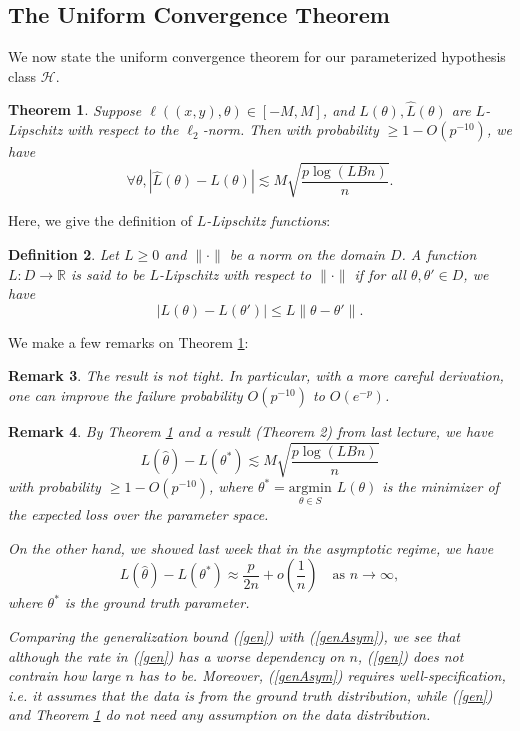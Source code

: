 \documentclass[11pt]{article}
\newtheorem{theorem}{Theorem}
\newtheorem{definition}[theorem]{Definition}
\newtheorem{remark}[theorem]{Remark}
\newcommand{\R}{\mathbb{R}}
\newcommand{\norm}[1]{\| #1 \|}
\begin{document}
\subsection{The Uniform Convergence Theorem}
We now state the uniform convergence theorem for our parameterized hypothesis class $\mathcal H$.

\begin{theorem}\label{main}
Suppose $\ell((x,y), \theta) \in [-M,M]$, and $L(\theta), \hat L(\theta)$ are $L$-Lipschitz with respect to the $\ell_2$-norm. Then with probability $\ge 1-O(p^{-10})$, we have
\begin{equation}
    \forall \theta, |\hat L(\theta)- L(\theta)| \lesssim M \sqrt{\frac{p \log(LBn)}{n}}.
\end{equation}
\end{theorem}
Here, we give the definition of \emph{$L$-Lipschitz functions}:
\begin{definition}
Let $L \ge 0$ and $\norm{\cdot}$ be a norm on the domain $D$. A function $L:D \to \R$ is said to be \emph{$L$-Lipschitz} with respect to $\norm{\cdot}$ if for all $\theta, \theta' \in D$, we have
$$
    |L(\theta)-L(\theta')| \le L \norm{\theta-\theta'}.
$$
\end{definition}

We make a few remarks on Theorem \ref{main}:
\begin{remark} \label{Tight}
    The result is not tight. In particular, with a more careful derivation, one can improve the failure probability $O(p^{-10})$ to $O(e^{-p})$.
\end{remark}   

\begin{remark}
    By Theorem \ref{main} and a result (Theorem 2) from last lecture, we have \begin{equation}\label{gen}L(\hat \theta) - L(\theta^*) \lesssim M \sqrt{\frac{p \log (LBn)}{n}}\end{equation} with probability $\ge 1-O(p^{-10})$, where $\theta^* = \underset{\theta \in S}{\mathrm{argmin}}$ $L(\theta)$ is the minimizer of the expected loss over the parameter space. 

    On the other hand, we showed last week that in the asymptotic regime, we have 
    \begin{equation}\label{genAsym}L(\hat \theta) - L(\theta^*) \approx \frac{p}{2n} + o\left(\frac{1}{n}\right) \quad \text{as } n \to \infty,\end{equation}
    where $\theta^*$ is the ground truth parameter. 
    
    Comparing the generalization bound (\ref{gen}) with (\ref{genAsym}), we see that although the rate in (\ref{gen}) has a worse dependency on $n$, (\ref{gen}) does not contrain how large $n$ has to be. Moreover, (\ref{genAsym}) requires well-specification, i.e. it assumes that the data is from the ground truth distribution, while (\ref{gen}) and Theorem \ref{main} do not need any assumption on the data distribution.
\end{remark}
\end{document}
